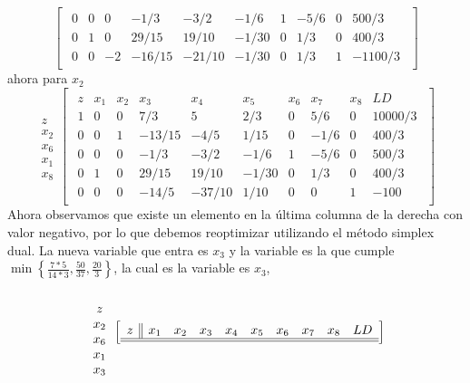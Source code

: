 \documentclass[11pt,letterpaper]{article}
\begin{document}
\begin{enumerate}
\begin{equation}
\begin{bmatrix}
\begin{array}{c||ccccccccc}
  0 & 0 & 0 &-1/3 & -3/2 & -1/6 & 1 & -5/6&0& 500/3 \\
  0 & 1 & 0 & 29/15 & 19/10 & -1/30 & 0 & 1/3 &0&400/3 \\
  0 & 0 & -2 &-16/15 & -21/10 &-1/30 & 0 & 1/3 &1&-1100/3
\end{array}
\end{bmatrix}
\end{equation}
ahora para $x_2$
\begin{equation} 
\begin{array}{c}
\\
z \\ 
x_2 \\
x_6 \\
x_1\\
x_8
\end{array}
\begin{bmatrix}
\begin{array}{c||ccccccccc}
  z & x_1 & x_2 & x_3 & x_4 & x_5 & x_6 & x_7 & x_8 & LD\\ \hline \hline
  1 & 0 & 0 & 7/3 & 5 & 2/3 & 0 & 5/6 &0 & 10000/3\\ 
  0 & 0 & 1 &-13/15 & -4/5 & 1/15 & 0 &-1/6 &0& 400/3  \\
  0 & 0 & 0 &-1/3 & -3/2 & -1/6 & 1 & -5/6&0& 500/3 \\
  0 & 1 & 0 & 29/15 & 19/10 & -1/30 & 0 & 1/3 &0&400/3 \\
  0 & 0 & 0 &-14/5 & -37/10 &1/10 & 0 & 0 &1&-100
\end{array}
\end{bmatrix}
\end{equation}
Ahora observamos que existe un elemento en la última columna de la derecha con valor negativo, por lo que debemos reoptimizar utilizando el método simplex dual. La nueva variable que entra es $x_3$ y la variable es la que cumple $\min \left\{\frac{7*5}{14*3}, \frac{50}{37},\frac{20}{3} \right\}$, la cual es la variable es $x_3$,
\begin{equation} 
\begin{array}{c}
\\
z \\ 
x_2 \\
x_6 \\
x_1\\
x_3
\end{array}
\begin{bmatrix}
\begin{array}{c||ccccccccc}
  z & x_1 & x_2 & x_3 & x_4 & x_5 & x_6 & x_7 & x_8 & LD\\ \hline \hline

\end{array}
\end{bmatrix}
\end{equation}
\end{enumerate}
\end{document}
